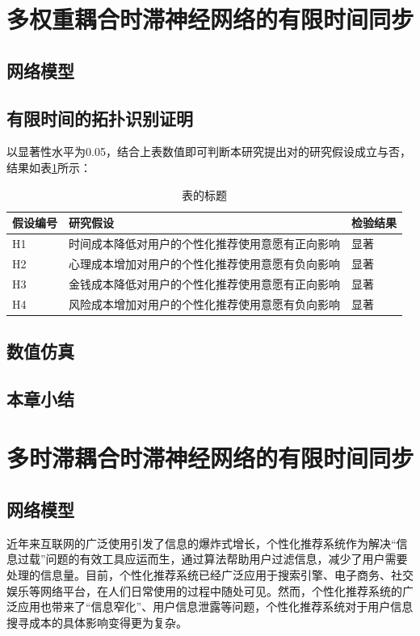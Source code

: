 \documentclass[a4paper,zihao=-4,UTF8]{ctexart}
\numberwithin{equation}{section}
\newcommand{\bold}[2][0.3]{\setBold[#1]#2\unsetBold}
\begin{document}
\section{多权重耦合时滞神经网络的有限时间同步}
	\subsection{网络模型}
	\subsection{有限时间的拓扑识别证明}
	以显著性水平为0.05，结合上表数值即可判断本研究提出对的研究假设成立与否，结果如表\ref{tab:4-1}所示：
	\begin{table}[h]
		\centering
		\caption{表的标题}
		\label{tab:4-1}
		\begin{tabular}{@{}lll@{}}
			\toprule
			\bold{假设编号} & \textbf{研究假设}            & \bold{检验结果} \\ \midrule
			H1            & 时间成本降低对用户的个性化推荐使用意愿有正向影响 & 显著            \\
			H2            & 心理成本增加对用户的个性化推荐使用意愿有负向影响 & 显著            \\
			H3            & 金钱成本降低对用户的个性化推荐使用意愿有正向影响 & 显著            \\
			H4            & 风险成本增加对用户的个性化推荐使用意愿有负向影响 & 显著            \\ \bottomrule
		\end{tabular}
	\end{table}
	\subsection{数值仿真}
	\subsection{本章小结}

\section{多时滞耦合时滞神经网络的有限时间同步}
	\subsection{网络模型}
	近年来互联网的广泛使用引发了信息的爆炸式增长，个性化推荐系统作为解决“信息过载”问题的有效工具应运而生，通过算法帮助用户过滤信息，减少了用户需要处理的信息量。目前，个性化推荐系统已经广泛应用于搜索引擎、电子商务、社交娱乐等网络平台，在人们日常使用的过程中随处可见。然而，个性化推荐系统的广泛应用也带来了“信息窄化”、用户信息泄露等问题，个性化推荐系统对于用户信息搜寻成本的具体影响变得更为复杂。
	
\end{document}
